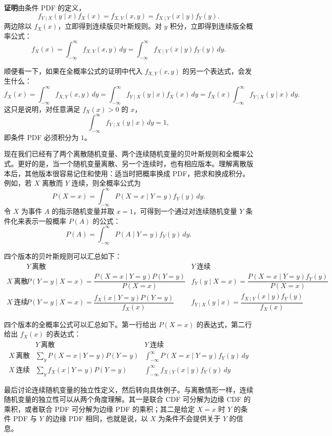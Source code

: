 \documentclass[UTF8,12pt,a4paper,fontset=fandol]{ctexart}
\begin{document}
\noindent\textbf{证明}\quad 由条件 PDF 的定义，
\[
  f_{Y\mid X}(y\mid x)f_X(x)=f_{X,Y}(x,y)=f_{X\mid Y}(x\mid y)f_Y(y).
\]
两边除以 $f_X(x)$，立即得到连续版贝叶斯规则。对 $y$ 积分，立即得到连续版全概率公式：
\[
  f_X(x)=\int_{-\infty}^{\infty} f_{X,Y}(x,y)\,dy
  =\int_{-\infty}^{\infty} f_{X\mid Y}(x\mid y)f_Y(y)\,dy.
\]

顺便看一下，如果在全概率公式的证明中代入 $f_{X,Y}(x,y)$ 的另一个表达式，会发生什么：
\[
  f_X(x)=\int_{-\infty}^{\infty} f_{X,Y}(x,y)\,dy
  =\int_{-\infty}^{\infty} f_{Y\mid X}(y\mid x)f_X(x)\,dy
  =f_X(x)\int_{-\infty}^{\infty} f_{Y\mid X}(y\mid x)\,dy.
\]
这只是说明，对任意满足 $f_X(x)>0$ 的 $x$，
\[
  \int_{-\infty}^{\infty} f_{Y\mid X}(y\mid x)\,dy=1,
\]
即条件 PDF 必须积分为 $1$。

现在我们已经有了两个离散随机变量、两个连续随机变量的贝叶斯规则和全概率公式。更好的是，当一个随机变量离散、另一个连续时，也有相应版本。理解离散版本后，其他版本很容易记住和使用：适当时把概率换成 PDF，把求和换成积分。例如，若 $X$ 离散而 $Y$ 连续，则全概率公式为
\[
  P(X=x)=\int_{-\infty}^{\infty}P(X=x\mid Y=y)f_Y(y)\,dy.
\]
令 $X$ 为事件 $A$ 的指示随机变量并取 $x=1$，可得到一个通过对连续随机变量 $Y$ 条件化来表示一般概率 $P(A)$ 的公式：
\[
  P(A)=\int_{-\infty}^{\infty}P(A\mid Y=y)f_Y(y)\,dy.
\]

四个版本的贝叶斯规则可以汇总如下：
\[
\begin{array}{c|cc}
 & Y\ \text{离散} & Y\ \text{连续}\\ \hline
X\ \text{离散} &
P(Y=y\mid X=x)=\dfrac{P(X=x\mid Y=y)P(Y=y)}{P(X=x)} &
f_Y(y\mid X=x)=\dfrac{P(X=x\mid Y=y)f_Y(y)}{P(X=x)}
\\[1.1em]
X\ \text{连续} &
P(Y=y\mid X=x)=\dfrac{f_X(x\mid Y=y)P(Y=y)}{f_X(x)} &
f_{Y\mid X}(y\mid x)=\dfrac{f_{X\mid Y}(x\mid y)f_Y(y)}{f_X(x)}
\end{array}
\]

四个版本的全概率公式可以汇总如下。第一行给出 $P(X=x)$ 的表达式，第二行给出 $f_X(x)$ 的表达式：
\[
\begin{array}{c|cc}
 & Y\ \text{离散} & Y\ \text{连续}\\ \hline
X\ \text{离散} &
\sum_y P(X=x\mid Y=y)P(Y=y) &
\int_{-\infty}^{\infty}P(X=x\mid Y=y)f_Y(y)\,dy
\\[1.1em]
X\ \text{连续} &
\sum_y f_X(x\mid Y=y)P(Y=y) &
\int_{-\infty}^{\infty}f_{X\mid Y}(x\mid y)f_Y(y)\,dy
\end{array}
\]

最后讨论连续随机变量的独立性定义，然后转向具体例子。与离散情形一样，连续随机变量的独立性可以从两个角度理解。其一是联合 CDF 可分解为边缘 CDF 的乘积，或者联合 PDF 可分解为边缘 PDF 的乘积；其二是给定 $X=x$ 时 $Y$ 的条件 PDF 与 $Y$ 的边缘 PDF 相同，也就是说，以 $X$ 为条件不会提供关于 $Y$ 的信息。
\end{document}
